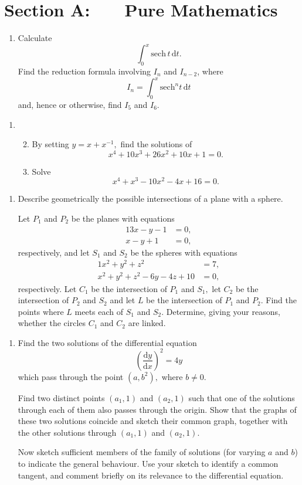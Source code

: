 \documentclass[a4, 11pt]{report}
\newlength{\qspace}
\newcounter{qnumber}
\newenvironment{question}%
 {\vspace{\qspace}
  \begin{enumerate}[\bfseries 1\quad][10]%
    \setcounter{enumi}{\value{qnumber}}%
    \item%
 }
{
  \end{enumerate}
  \filbreak
  \stepcounter{qnumber}
 }
\newenvironment{questionparts}[1][1]%
 {
  \begin{enumerate}[\bfseries (i)]%
    \setcounter{enumii}{#1}
    \addtocounter{enumii}{-1}
    \setlength{\itemsep}{5mm}
    \setlength{\parskip}{8pt}
 }
 {
  \end{enumerate}
 }
\begin{document}
\setcounter{page}{2}

 
\section*{Section A: \ \ \ Pure Mathematics}

\begin{question}
Calculate 
\[
\int_{0}^{x}\mathrm{sech}\, t\,\mathrm{d}t.
\]
Find the reduction formula involving $I_{n}$ and $I_{n-2}$, where
\[
I_{n}=\int_{0}^{x}\mathrm{sech}^{n}t\,\mathrm{d}t
\]
and, hence or otherwise, find $I_{5}$ and $I_{6}.$ 
\end{question}

\begin{question}
\begin{questionparts}
 \item By setting $y=x+x^{-1},$ find the solutions
of 
\[
x^{4}+10x^{3}+26x^{2}+10x+1=0.
\]

\item Solve 
\[
x^{4}+x^{3}-10x^{2}-4x+16=0.
\]		
\end{questionparts}
\end{question}

\begin{question}
Describe geometrically the possible intersections of a plane with
a sphere. 


Let $P_{1}$ and $P_{2}$ be the planes with equations 
\begin{alignat*}{1}
3x-y-1 & =0,\\
x-y+1 & =0,
\end{alignat*}
respectively, and let $S_{1}$ and $S_{2}$ be the spheres with equations
\begin{alignat*}{1}
x^{2}+y^{2}+z^{2} & =7,\\
x^{2}+y^{2}+z^{2}-6y-4z+10 & =0,
\end{alignat*}
respectively. Let $C_{1}$ be the intersection of $P_{1}$ and $S_{1},$
let $C_{2}$ be the intersection of $P_{2}$ and $S_{2}$ and let
$L$ be the intersection of $P_{1}$ and $P_{2}.$ Find the points
where $L$ meets each of $S_{1}$ and $S_{2}.$ Determine, giving
your reasons, whether the circles $C_{1}$ and $C_{2}$ are linked. 
\end{question}

\begin{question}
Find the two solutions of the differential equation 
\[
\left(\frac{\mathrm{d}y}{\mathrm{d}x}\right)^{2}=4y
\]
which pass through the point $(a,b^{2}),$ where $b\neq0.$


Find two distinct points $(a_{1},1)$ and $(a_{2},1)$ such that one
of the solutions through each of them also passes through the origin.
Show that the graphs of these two solutions coincide and sketch their
common graph, together with the other solutions through $(a_{1},1)$
and $(a_{2},1)$. 


Now sketch sufficient members of the family of solutions (for varying
$a$ and $b$) to indicate the general behaviour. Use your sketch
to identify a common tangent, and comment briefly on its relevance
to the differential equation. 
	\end{question}
\end{document}
